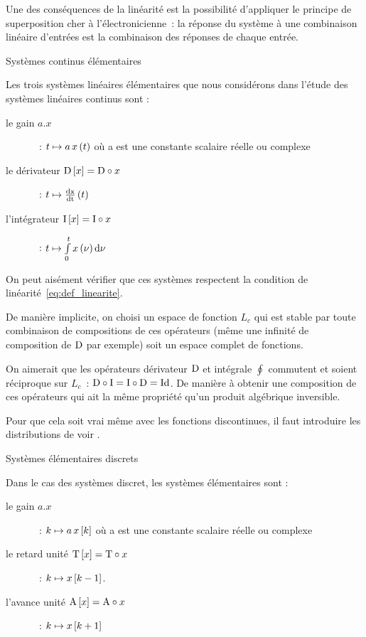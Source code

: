 Une des conséquences de la linéarité est la possibilité d'appliquer le
principe de superposition cher à l'électronicienne~: \og{} la réponse
du système à une combinaison linéaire d'entrées est la combinaison des
réponses de chaque entrée.\fg{}

\begin{definition}{Systèmes continus élémentaires}
  \label{def:systeme_elementaires_continus}
  
Les trois systèmes linéaires élémentaires que nous considérons dans
l'étude des systèmes linéaires continus sont :
\begin{description}
\item[le gain $a.x$]~: $t \mapsto a\,x\left(t\right)$ où a est une constante
  scalaire réelle ou complexe
\item[le dérivateur $\mathrm{D}\left[x\right]=\mathrm{D}\circ x$]~: $ t \mapsto \frac{\mathrm{d{x}}}{\mathrm{d{t}}}\left(t\right) $
\item[l'intégrateur $\mathrm{I}\left[x\right]=\mathrm{I}\circ x$]~: $ t \mapsto \int\limits_{0}^{t}{x\left(\nu\right)\mathrm{d{\nu}}}$ 
\end{description}
\end{definition}

On peut aisément vérifier que ces systèmes respectent la condition de
linéarité~\ref{eq:def_linearite}.

\begin{remarque}
  De manière implicite, on choisi un espace de fonction $L_c$ qui est
  stable par toute combinaison de compositions de ces opérateurs (même
  une infinité de composition de $\mathrm{D}$ par exemple) soit un espace
  complet de fonctions.

  On aimerait que les opérateurs dérivateur $\mathrm{D}$ et intégrale
  $\oint$ commutent et soient réciproque sur $L_c$~:
  $\mathrm{D}\circ\mathrm{I}=\mathrm{I}\circ\mathrm{D}=\mathrm{Id}$. De manière à obtenir une
  composition de ces opérateurs qui ait la même propriété qu'un
  produit algébrique inversible.
  
  Pour que cela soit vrai même avec les fonctions discontinues, il
  faut introduire les distributions de \Dirac{} voir
  .
\end{remarque}

\begin{definition}{Systèmes élémentaires discrets}
  
Dans le cas des systèmes discret, les systèmes élémentaires sont :
\begin{description}
\item[le gain $a.x$]~: $ k \mapsto a\,x\left[k\right]$ où a est une constante
  scalaire réelle ou complexe
\item[le retard unité $\mathrm{T}\left[x\right]=\mathrm{T}\circ x$]~: $ k \mapsto x\left[k-1\right]$.
\item[l'avance unité $\mathrm{A}\left[x\right]=\mathrm{A}\circ x$]~: $ k \mapsto x\left[k+1\right] $ 
\end{description}
\end{definition}

